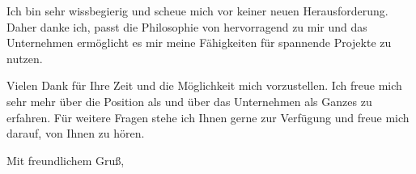 \documentclass[12pt]{extarticle}
\begin{document}
Ich bin sehr wissbegierig und scheue mich vor keiner neuen Herausforderung.
Daher danke ich, passt die Philosophie von \@company hervorragend zu mir und das Unternehmen ermöglicht es mir meine Fähigkeiten für spannende Projekte zu nutzen.\par
%
%
%
Vielen Dank für Ihre Zeit und die Möglichkeit mich vorzustellen.
Ich freue mich sehr mehr über die Position als \@positionshort und über das Unternehmen \@company als Ganzes zu erfahren.
Für weitere Fragen stehe ich Ihnen gerne zur Verfügung und freue mich darauf, von Ihnen zu hören.\par
%
Mit freundlichem Gruß,\par
%
\@author
%
\end{document}
